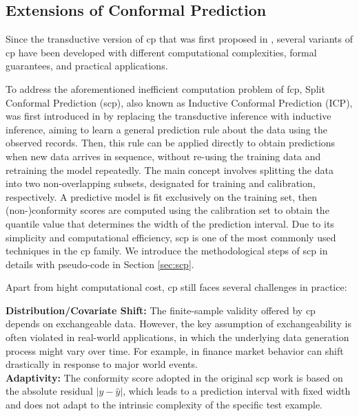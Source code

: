 \subsection{Extensions of Conformal Prediction}
Since the transductive version of \gls{cp} that was first proposed in \cite{gammerman1998learning}, several variants of \gls{cp} have been developed with different computational complexities, formal guarantees, and practical applications.

To address the aforementioned inefficient computation problem of \gls{fcp}, Split Conformal Prediction (\gls{scp}), also known as Inductive Conformal Prediction (ICP), was first introduced in \cite{papadopoulos2002inductive} by replacing the transductive inference with inductive inference, aiming to learn a general prediction rule about the data using the observed records. Then, this rule can be applied directly to obtain predictions when new data arrives in sequence, without re-using the training data and retraining the model repeatedly. The main concept involves splitting the data into two non-overlapping subsets, designated for training and calibration, respectively. A predictive model is fit exclusively on the training set, then (non-)conformity scores are computed using the calibration set to obtain the quantile value that determines the width of the prediction interval. Due to its simplicity and computational efficiency, \gls{scp} is one of the most commonly used techniques in the \gls{cp} family. We introduce the methodological steps of \gls{scp} in details with pseudo-code in Section \ref{sec:scp}.

\vspace{0.5em} 	
Apart from hight computational cost, \gls{cp} still faces several challenges in practice: 
\vspace{0.2em} 

\noindent \textbf{Distribution/Covariate Shift:} The finite-sample validity offered by \gls{cp} depends on exchangeable data. However, the key assumption of exchangeability is often violated in real-world applications, in which the underlying data generation process might vary over time. For example, in finance market behavior can shift drastically in response to major world events. \\
 \noindent \textbf{Adaptivity:} The conformity score adopted in the original \gls{scp} work is based on the  absolute residual $|y - \hat{y}|$, which leads to a prediction interval with fixed width and does not adapt to the intrinsic complexity of the specific test example.
\vspace{0.5em} 


